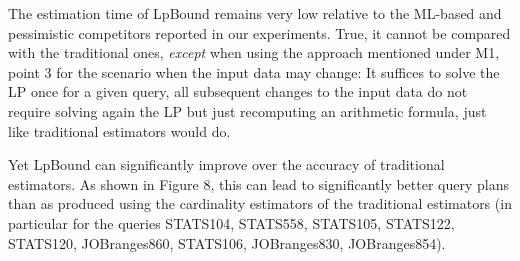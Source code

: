 {
\color{blue}
The estimation time of LpBound remains very low relative to the ML-based and pessimistic competitors reported in our experiments. True, it cannot be compared with the traditional ones, {\em except} when using the approach mentioned under M1, point 3 for the scenario when the input data may change: It suffices to solve the LP once for a given query, all subsequent changes to the input data do not require solving again the LP but just recomputing an arithmetic formula, just like traditional estimators would do.

Yet LpBound can significantly improve over the accuracy of traditional estimators. As shown in Figure 8, this can lead to significantly better query plans than as produced using the cardinality estimators of the traditional estimators (in particular for the queries STATS104, STATS558, STATS105, STATS122, STATS120, JOBranges860, STATS106, JOBranges830, JOBranges854). 
}

